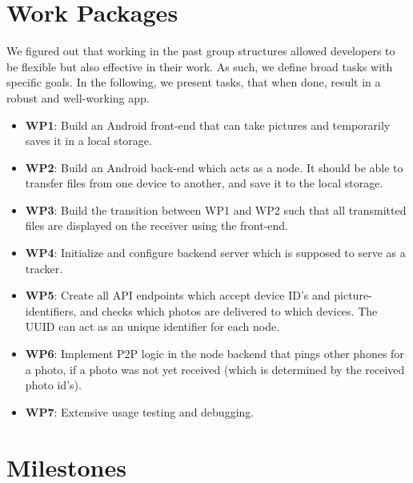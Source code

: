 \documentclass{report}
\begin{document}
\section{Work Packages}
We figured out that working in the past group structures allowed developers to be flexible but also effective in their work. As such, we define broad tasks with specific goals.
In the following, we present tasks, that when done, result in a robust and well-working app.

\begin{itemize}
        \item {\bf WP1}:  Build an Android front-end that can take pictures and temporarily saves it in a local storage.    
        \item {\bf WP2}:  Build an Android back-end which acts as a node. 
        It should be able to transfer files from one device to another, and save it to the local storage.
        \item {\bf WP3}: Build the transition between WP1 and WP2 such that all transmitted files are displayed on the receiver using the front-end.    
        \item {\bf WP4}: Initialize and configure backend server which is supposed to serve as a tracker.    
        \item {\bf WP5}: Create all API endpoints which accept device ID's and picture-identifiers, and checks which photos are delivered to which devices. 
        The UUID can act as an unique identifier for each node.    
        \item {\bf WP6}: Implement P2P logic in the node backend that pings other phones for a photo, if a photo was not yet received (which is determined by the received photo id's). 
        \item {\bf WP7}: Extensive usage testing and debugging.
\end{itemize}
 
\section{Milestones}
\end{document}

